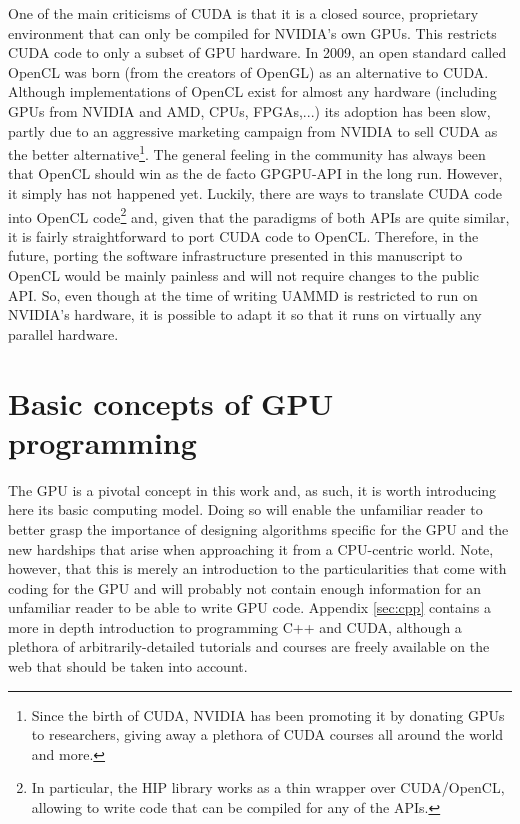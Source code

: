 \documentclass[ twoside,openright,titlepage,numbers=noenddot,%
headinclude,footinclude,cleardoublepage=empty,abstract=on,
BCOR=5mm,paper=a4,fontsize=11pt, dvipsnames
]{scrreprt}
\newcommand{\uammd}{\gls{UAMMD}\xspace}
\newcommand{\gpu}{\gls{GPU}\xspace}
\begin{document}
One of the main criticisms of CUDA is that it is a closed source, proprietary environment that can only be compiled for NVIDIA's own \glspl{GPU}. This restricts CUDA code to only a subset of \gpu hardware.
In 2009, an open standard called OpenCL\cite{Stone2010} was born (from the creators of OpenGL) as an alternative to CUDA. Although implementations of OpenCL exist for almost any hardware (including GPUs from NVIDIA and AMD, CPUs, FPGAs,...) its adoption has been slow, partly due to an aggressive marketing campaign from NVIDIA to sell CUDA as the better alternative\footnote{Since the birth of CUDA, NVIDIA has been promoting it by donating GPUs to researchers, giving away a plethora of CUDA courses all around the world and more.}. The general feeling in the community has always been that OpenCL should win as the de facto \gls{GPGPU}-\gls{API} in the long run. However, it simply has not happened yet.
Luckily, there are ways to translate CUDA code into OpenCL code\footnote{In particular, the HIP library works as a thin wrapper over CUDA/OpenCL, allowing to write code that can be compiled for any of the \glspl{API}.} and, given that the paradigms of both \glspl{API} are quite similar, it is fairly straightforward to port CUDA code to OpenCL. Therefore, in the future, porting the software infrastructure presented in this manuscript to OpenCL would be mainly painless and will not require changes to the public \gls{API}. So, even though at the time of writing \uammd is restricted to run on NVIDIA's hardware, it is possible to adapt it so that it runs on virtually any parallel hardware.

\section{Basic concepts of GPU programming}\label{ch:gpuintroduction}
The \gpu is a pivotal concept in this work and, as such, it is worth introducing here its basic computing model. Doing so will enable the unfamiliar reader to better grasp the importance of designing algorithms specific for the \gpu and the new hardships that arise when approaching it from a CPU-centric world. Note, however, that this is merely an introduction to the particularities that come with coding for the \gpu and will probably not contain enough information for an unfamiliar reader to be able to write \gpu code. Appendix \ref{sec:cpp} contains a more in depth introduction to programming C++ and CUDA, although a plethora of arbitrarily-detailed tutorials and courses are freely available on the web that should be taken into account.
\end{document}
